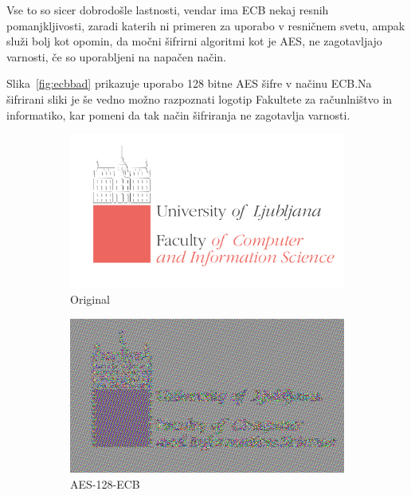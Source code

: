 \documentclass[12pt,a4paper,openany]{book}
\begin{document}
Vse to so sicer dobrodošle lastnosti, vendar ima \gls{ECB} nekaj resnih pomanjkljivosti, zaradi katerih ni primeren za uporabo v resničnem svetu, ampak služi bolj kot opomin, da močni šifrirni algoritmi kot je \gls{AES}, ne zagotavljajo varnosti, če so uporabljeni na napačen način.

Slika~\ref{fig:ecbbad} prikazuje uporabo 128 bitne AES šifre v načinu ECB.\@ Na šifrirani sliki je še vedno možno razpoznati logotip Fakultete za računlništvo in informatiko, kar pomeni da tak način šifriranja ne zagotavlja varnosti.

\begin{figure}[ht!]
  \centering
  \begin{subfigure}[b]{0.3\textwidth}
    \includegraphics[width=\textwidth]{images/LogoFRI}
    \caption{Original}
\label{fig:logoFRIorig}
  \end{subfigure}
  \begin{subfigure}[b]{0.3\textwidth}
    \includegraphics[width=\textwidth]{images/LogoFRI_ecb}
    \caption{AES-128-ECB}
\label{fig:logoFRIECB}
  \end{subfigure}
  \begin{subfigure}[b]{0.3\textwidth}

\end{subfigure}
\end{figure}
\end{document}
